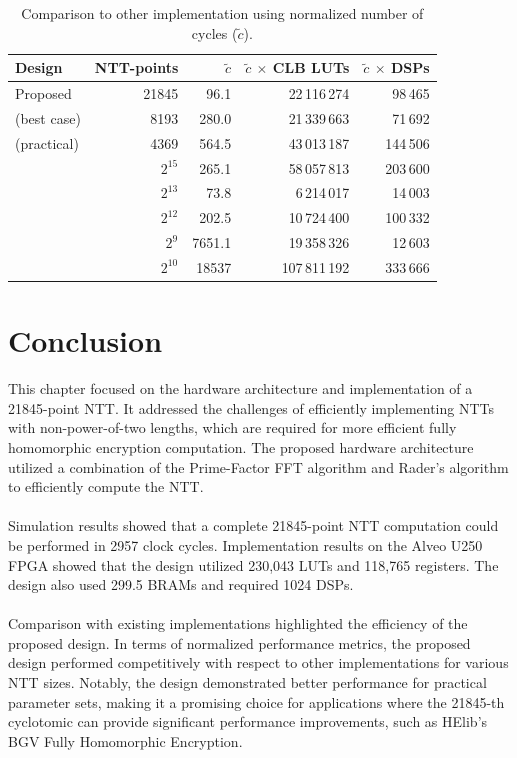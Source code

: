 \documentclass[english,master=eelt,masteroption=ec]{kulemt}
\begin{document}
\begin{table}[h!]
\caption{Comparison to other implementation using normalized number of cycles ($\tilde{c}$).}
\label{table:performance_comparison}
\centering
\begin{tabular}{ |l|r|r|r|r| } 
 \hline
 Design & NTT-points & $\tilde{c}$ & $\tilde{c}$ $\times$ CLB LUTs &  $\tilde{c}$ $\times$ DSPs \\ \hline \hline 
 Proposed  & 21845 & 96.1	& 22\,116\,274 & 98\,465 \\ \hline 
 \cite{9937536} (best case) & 8193 & 280.0 & 21\,339\,663 & 71\,692 \\ \hline 
 \cite{9937536} (practical) & 4369 & 564.5 & 43\,013\,187 & 144\,506 \\ \hline 
 \cite{ozturk2574340} & $2^{15}$ & 265.1 & 58\,057\,813 & 203\,600 \\ \hline 
 \cite{10.1145/3373376.3378523} & $2^{13}$ & 73.8 & 6\,214\,017 & 14\,003 \\ \hline 
 \cite{9171507} & $2^{12}$ & 202.5 & 10\,724\,400 & 100\,332 \\ \hline 
 \cite{cryptoeprint:2013/866} & $2^{9}$ & 7651.1 & 19\,358\,326 & 12\,603 \\ \hline 
 \cite{cryptoeprint:2020/446} & $2^{10}$ & 18537 & 107\,811\,192 & 333\,666 \\ \hline
\end{tabular}
\end{table}

\FloatBarrier

\section{Conclusion}
This chapter focused on the hardware architecture and implementation of a 21845-point NTT. It addressed the challenges of efficiently implementing NTTs with non-power-of-two lengths, which are required for more efficient fully homomorphic encryption computation. The proposed hardware architecture utilized a combination of the Prime-Factor FFT algorithm and Rader's algorithm to efficiently compute the NTT.
\\\\
Simulation results showed that a complete 21845-point NTT computation could be performed in 2957 clock cycles. Implementation results on the Alveo U250 FPGA showed that the design utilized 230,043 LUTs and 118,765 registers. The design also used 299.5 BRAMs and required 1024 DSPs.
\\\\
Comparison with existing implementations highlighted the efficiency of the proposed design. In terms of normalized performance metrics, the proposed design performed competitively with respect to other implementations for various NTT sizes. Notably, the design demonstrated better performance for practical parameter sets, making it a promising choice for applications where the 21845-th cyclotomic can provide significant performance improvements, such as HElib's BGV Fully Homomorphic Encryption.
\end{document}
